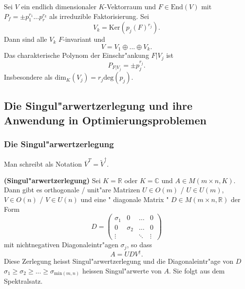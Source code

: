 \documentclass[8pt, a4paper, twocolumn, landscape]{article}
\begin{document}
{\begin{theorem}
 \end{theorem}
 
 \begin{theorem}
 Sei $V$ ein endlich dimensionaler $K$-Vektorraum und $F \in \mathrm{End}(V)$ mit $P_f = \pm p_1^{r_1} ... p_r^{r_k}$ als irreduzible Faktorisierung. Sei 
 $$
 V_k = \mathrm{Ker}(p_j(F)^{r_j}).
 $$
 Dann sind alle $V_k$ $F$-invariant und
 $$
 V = V_1 \oplus ... \oplus V_k.
 $$
 Das charakterische Polynom der Einschr"ankung $F|V_j$ ist
 $$
 P_{F|V_j} = \pm p_j^{r_j}.
 $$
 Insbesondere als $\mathrm{dim}_K(V_j) = r_j \mathrm{deg}(p_j)$.
 \end{theorem}


}


\subsection{Die Singul"arwertzerlegung und ihre Anwendung in Optimierungsproblemen}
\subsubsection{Die Singul"arwertzerlegung}

\begin{definition}
Man schreibt als Notation $\overline{V}^T = \tilde{V}^{\dagger}$.
\end{definition}

\begin{definition} \textbf{(Singul"arwertzerlegung)} Sei $K = \mathbb{R}$ oder $K = \mathbb{C}$ und $A \in M(m \times n, K)$. Dann gibt es orthogonale  / unit"are Matrizen $U \in O(m)$ / $U \in U(m)$, $V \in O(n)$ / $V \in U(n)$ und eine " diagonale Matrix  " $D\in M(m \times n, \mathbb{R})$ der Form 
$$
D=\left(\begin{array}{cccc}\sigma_{1} & 0 & \dots & 0 \\ 0 & \sigma_{2} & \dots & 0 \\ \vdots & & \ddots & \vdots\end{array}\right)
$$
mit nichtnegativen Diagonaleintr"agen $\sigma_j$, so dass
$$
A = U D V^\dagger.
$$
Diese Zerlegung heisst Singul"arwertzerlegung und die Diagonaleintr"age von $D$ $\sigma_1 \geq \sigma_2 \geq ... \geq \sigma_{\mathrm{min}(m,n)}$ heissen Singul"arwerte von $A$. Sie folgt aus dem Spektralsatz.

\end{definition}
\end{document}

